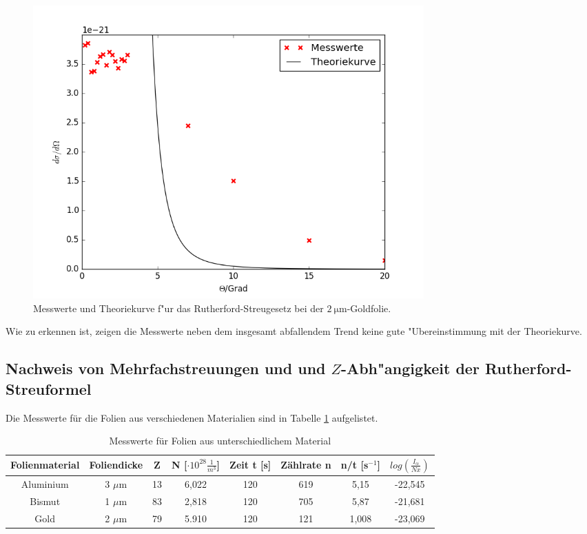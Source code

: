   \begin{figure}
    \centering
    \includegraphics[width=15cm]{skripte/ruther.png}
    \caption{Messwerte und Theoriekurve f"ur das Rutherford-Streugesetz bei der $\SI{2}{\micro \meter}$-Goldfolie.}
    \label{plot:ruther}
  \end{figure}

  Wie zu erkennen ist, zeigen die Messwerte neben dem insgesamt abfallendem Trend keine gute "Ubereinstimmung mit der Theoriekurve.

  \newpage



  \subsection{Nachweis von Mehrfachstreuungen und und $Z$-Abh"angigkeit der Rutherford-Streuformel}



Die Messwerte für die Folien aus verschiedenen Materialien sind in Tabelle \ref{tab:werte} aufgelistet.

\begin{table}[H] 
\centering
\begin{tabular}{c|c c c c c c c}

	Folienmaterial & Foliendicke & Z & N [$\cdot 10^{28} \frac{1}{m^3}$]& Zeit t [s]& Zählrate n & n/t [s$^{-1}$] & $log(\frac{I_\alpha}{Nx})$ \\ 
	\hline 
	Aluminium & 3 $\mu$m & 13 & 6,022 & 120  & 619 & 5,15 & -22,545 \\ 

	Bismut &1 $\mu$m & 83 & 2,818 & 120 & 705 & 5,87 & -21,681\\ 

	Gold & 2 $\mu$m& 79 &  5.910 & 120 & 121 & 1,008 & -23,069\\ 

\end{tabular} 
	\caption{Messwerte für Folien aus unterschiedlichem Material} 
	\label{tab:werte}
\end{table}
 

